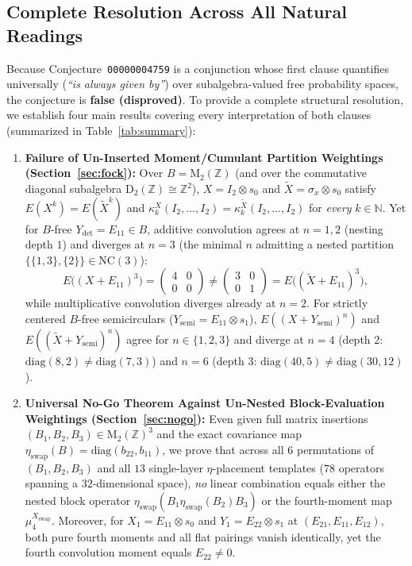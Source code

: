 \documentclass[11pt,a4paper]{article}
\theoremstyle{definition}
\newcommand{\NC}{\mathrm{NC}}
\newcommand{\Mat}{\mathrm{M}}
\newcommand{\Diag}{\mathrm{D}}
\begin{document}
\subsection{Complete Resolution Across All Natural Readings}
Because Conjecture~\texttt{00000004759} is a conjunction whose first clause quantifies universally (\emph{``is always given by''}) over subalgebra-valued free probability spaces, the conjecture is \textbf{false (disproved)}. To provide a complete structural resolution, we establish four main results covering every interpretation of both clauses (summarized in Table~\ref{tab:summary}):

\begin{enumerate}
\item \textbf{Failure of Un-Inserted Moment/Cumulant Partition Weightings (Section~\ref{sec:fock}):} Over $B = \Mat_2(\mathbb{Z})$ (and over the commutative diagonal subalgebra $\Diag_2(\mathbb{Z}) \cong \mathbb{Z}^2$), $X = I_2 \otimes s_0$ and $\tilde{X} = \sigma_x \otimes s_0$ satisfy $E(X^k) = E(\tilde{X}^k)$ and $\kappa_k^X(I_2, \dots, I_2) = \kappa_k^{\tilde{X}}(I_2, \dots, I_2)$ for \emph{every} $k \in \mathbb{N}$. Yet for $B$-free $Y_{\det} = E_{11} \in B$, additive convolution agrees at $n = 1, 2$ (nesting depth $1$) and diverges at $n = 3$ (the minimal $n$ admitting a nested partition $\{\{1,3\},\{2\}\} \in \NC(3)$):
\[
E\bigl((X + E_{11})^3\bigr) = \begin{pmatrix} 4 & 0 \\ 0 & 0 \end{pmatrix} \neq \begin{pmatrix} 3 & 0 \\ 0 & 1 \end{pmatrix} = E\bigl((\tilde{X} + E_{11})^3\bigr),
\]
while multiplicative convolution diverges already at $n = 2$. For strictly centered $B$-free semicirculars ($Y_{\mathrm{semi}} = E_{11} \otimes s_1$), $E((X + Y_{\mathrm{semi}})^n)$ and $E((\tilde{X} + Y_{\mathrm{semi}})^n)$ agree for $n \in \{1,2,3\}$ and diverge at $n = 4$ (depth $2$: $\mathrm{diag}(8,2) \neq \mathrm{diag}(7,3)$) and $n = 6$ (depth $3$: $\mathrm{diag}(40,5) \neq \mathrm{diag}(30,12)$).

\item \textbf{Universal No-Go Theorem Against Un-Nested Block-Evaluation Weightings (Section~\ref{sec:nogo}):} Even given full matrix insertions $(B_1, B_2, B_3) \in \Mat_2(\mathbb{Z})^3$ and the exact covariance map $\eta_{\mathrm{swap}}(B) = \mathrm{diag}(b_{22}, b_{11})$, we prove that across all $6$ permutations of $(B_1, B_2, B_3)$ and all $13$ single-layer $\eta$-placement templates ($78$ operators spanning a $32$-dimensional space), \emph{no} linear combination equals either the nested block operator $\eta_{\mathrm{swap}}(B_1 \eta_{\mathrm{swap}}(B_2) B_3)$ or the fourth-moment map $\mu_4^{X_{\mathrm{swap}}}$. Moreover, for $X_1 = E_{11} \otimes s_0$ and $Y_1 = E_{22} \otimes s_1$ at $(E_{21}, E_{11}, E_{12})$, both pure fourth moments and all flat pairings vanish identically, yet the fourth convolution moment equals $E_{22} \neq 0$.


\end{enumerate}
\end{document}
